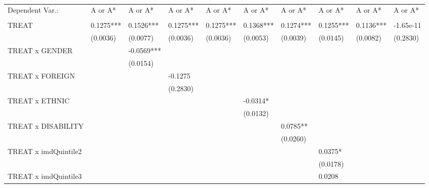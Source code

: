 \begin{table}[H]
\centering
\caption{}
\begin{adjustbox}{width = 1.1\textwidth,center}
\begin{tabular}{llllllllll}
\toprule
 Dependent Var.:                                                                                                                               & A or A*     & A or A*      & A or A*    & A or A*     & A or A*     & A or A*     & A or A*     & A or A*    & A or A*    \\
&&&&&&&&&\\

\midrule
 TREAT& 0.1275*** & 0.1526***& 0.1275***& 0.1275*** & 0.1368*** & 0.1274*** & 0.1255***& 0.1136***& -1.65e-11\\
&  (0.0036) & (0.0077) &  (0.0036)&
 (0.0036)  &  (0.0053) &  (0.0039) &  (0.0145)& (0.0082) & (0.2830) \\
 TREAT x GENDER&& -0.0569*** &&&&&&& \\
&& (0.0154)  &
&&&&&&\\
 TREAT x FOREIGN&&& -0.1275   &&&&&&                    \\
&&
& (0.2830) & &&&&& \\
 TREAT x ETHNIC&&&&& -0.0314* &&&&\\
        &&&&&  (0.0132)  &&&& \\
 TREAT x DISABILITY                                                                                                                            &                    &                     &                    &                     &                    & 0.0785**  &                    &                    &                    \\
        &&&&&&  (0.0260) &&& \\ 
 TREAT x imdQuintile2                                                                                                                          &                    &                     &                    &                     &                    &                    & 0.0375*   &                    &                    \\
        &&&&&&& (0.0178) && \\
 TREAT x imdQuintile3                                                                                                                          &                    &                     &                    &                     &                    &                    & 0.0208   &                    &                    \\

\end{tabular}
\end{adjustbox}
\end{table}
